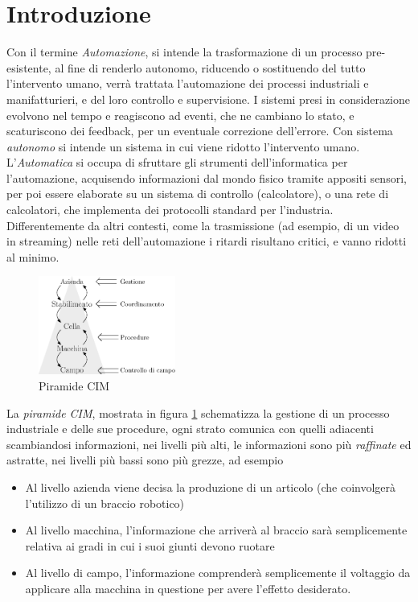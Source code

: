 \documentclass[10pt, letterpaper]{report}
\begin{document}
\section{Introduzione}
Con il termine \textit{Automazione}, si intende la trasformazione 
di un processo pre-esistente, al fine di renderlo autonomo, riducendo o 
sostituendo del tutto l'intervento umano, verrà trattata l'automazione 
dei processi industriali e manifatturieri, e del loro controllo e 
supervisione. I sistemi presi in considerazione evolvono nel 
tempo e reagiscono ad eventi, che ne cambiano lo stato, e scaturiscono 
dei feedback, per un eventuale correzione dell'errore.\acc 
Con sistema \textit{autonomo} si intende un sistema in cui viene 
ridotto l'intervento umano. L'\textit{Automatica} si occupa di 
sfruttare gli strumenti dell'informatica per l'automazione, acquisendo informazioni 
dal mondo fisico tramite appositi sensori, per poi essere elaborate 
su un sistema di controllo (calcolatore), o una rete di calcolatori, 
che implementa dei protocolli standard per l'industria. Differentemente da 
altri contesti, come la trasmissione (ad esempio, di un video in streaming) nelle 
reti dell'automazione i ritardi risultano critici, e vanno ridotti al 
minimo.
\begin{center}
    \begin{figure}[h!]
        \centering
        \includegraphics[width=0.4\textwidth ]{images/CIM.eps}
        \caption{Piramide CIM}
        \label{fig:cim}
   \end{figure}
   \end{center}
La \textit{piramide CIM}, mostrata in figura \ref{fig:cim}
schematizza la gestione di un processo industriale e delle sue procedure, 
ogni strato comunica con quelli adiacenti scambiandosi informazioni, nei 
livelli più alti, le informazioni sono più \textit{raffinate} ed 
astratte, nei livelli più bassi sono più grezze, ad esempio\begin{itemize}
    \item Al livello azienda viene decisa la produzione di un articolo (che 
    coinvolgerà l'utilizzo di un braccio robotico)
    \item Al livello macchina, l'informazione che arriverà al braccio 
    sarà semplicemente relativa ai gradi in cui i suoi giunti devono 
    ruotare
    \item Al livello di campo, l'informazione comprenderà semplicemente 
    il voltaggio da applicare alla macchina in questione per avere l'effetto 
    desiderato.
\end{itemize}
\end{document}
